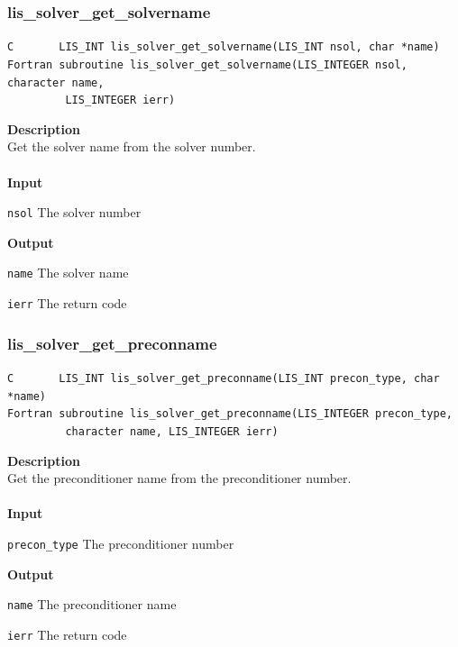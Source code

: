 \documentclass[a4paper]{article}
\newcommand{\namelistlabel}[1]{\mbox{#1}\hfill}
\newenvironment{namelist}[1]{%
\begin{list}{}
  {\let\makelabel\namelistlabel
  \settowidth{\labelwidth}{#1}
  \setlength{\leftmargin}{1.1\labelwidth}}
  }{%
\end{list}}
\begin{document}
\newpage
\subsubsection{lis\_solver\_get\_solvername}
\begin{screen}
\verb|C       LIS_INT lis_solver_get_solvername(LIS_INT nsol, char *name)|\\
\verb|Fortran subroutine lis_solver_get_solvername(LIS_INTEGER nsol, character name,|\\
\verb|         LIS_INTEGER ierr)|
\end{screen}
{\bf Description}\\
\indent
Get the solver name from the solver number.
\\ \\
\noindent
{\bf Input}
\begin{namelist}{XXXXXXXXXXXXXXXXXXXX}
\item[\tt nsol] The solver number
\end{namelist}
{\bf Output}
\begin{namelist}{XXXXXXXXXXXXXXXXXXXX}
\item[\tt name] The solver name
\item[\tt ierr] The return code
\end{namelist}

\subsubsection{lis\_solver\_get\_preconname}
\begin{screen}
\verb|C       LIS_INT lis_solver_get_preconname(LIS_INT precon_type, char *name)|\\
\verb|Fortran subroutine lis_solver_get_preconname(LIS_INTEGER precon_type,|\\
\verb|         character name, LIS_INTEGER ierr)|
\end{screen}
{\bf Description}\\
\indent
Get the preconditioner name from the preconditioner number.
\\ \\
\noindent
{\bf Input}
\begin{namelist}{XXXXXXXXXXXXXXXXXXXX}
\item[\tt precon\_type] The preconditioner number
\end{namelist}
{\bf Output}
\begin{namelist}{XXXXXXXXXXXXXXXXXXXX}
\item[\tt name] The preconditioner name
\item[\tt ierr] The return code
\end{namelist}
\end{document}

